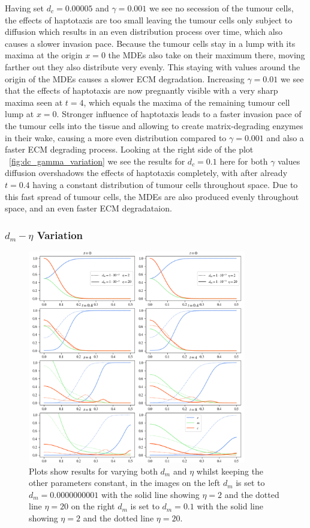 Having set $d_c=0.00005$ and $\gamma=0.001$ we see no secession of the tumour cells, the effects of haptotaxis are too small leaving the tumour cells only subject to diffusion which results in an even distribution process over time, which also causes a slower invasion pace. Because the tumour cells stay in a lump with its maxima at the origin $x=0$ the MDEs also take on their maximum there, moving farther out they also distribute very evenly. This staying with values around the origin of the MDEs causes a slower ECM degradation. Increasing $\gamma=0.01$ we see that the effects of haptotaxis are now pregnantly visible with a very sharp maxima seen at $t=4$, which equals the maxima of the remaining tumour cell lump at $x=0$. Stronger influence of haptotaxis leads to a faster invasion pace of the tumour cells into the tissue and allowing to create matrix-degrading enzymes in their wake, causing a more even distribution compared to $\gamma=0.001$ and also a faster ECM degrading process. 
Looking at the right side of the plot ~\ref{fig:dc_gamma_variation} we see the results for $d_c=0.1$ here for both $\gamma$ values diffusion overshadows the effects of haptotaxis completely, with after already $t=0.4$ having a constant distribution of tumour cells throughout space. Due to this fast spread of tumour cells, the MDEs are also produced evenly throughout space, and an even faster ECM degradataion. 

\subsubsection*{$d_m - \eta$ Variation}
\begin{figure}[h]
    \centering
    \includegraphics[width=0.85\textwidth]{resources/images/dm_eta_variation.png}
    \caption{Plots show results for varying both $d_m$ and $\eta$ whilst keeping the other parameters constant, in the images on the left $d_m$ is set to $d_m=0.0000000001$ with the solid line showing $\eta = 2$ and the dotted line $\eta=20$ on the right $d_m$ is set to $d_m=0.1$ with the solid line showing $\eta = 2$ and the dotted line $\eta=20$.}
    \label{fig:dm_eta_variation}
\end{figure}

